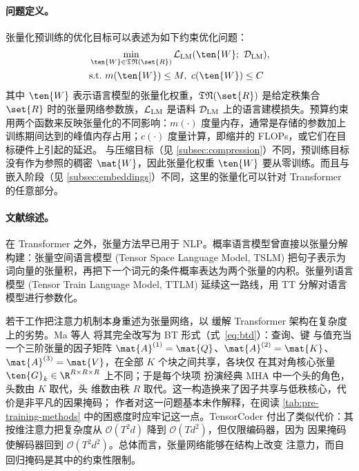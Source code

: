 \paragraph{问题定义。}

张量化预训练的优化目标可以表述为如下约束优化问题：
\begin{equation}
\begin{aligned}
& \min_{\ten{W} \in \mathfrak{TN}(\set{R})} \mathcal{L}_{\rm LM} (\ten{W}; \ \mathcal{D}_{\rm LM}), \\
& {\rm s.t.} ~ m(\ten{W}) \leq M,\ c(\ten{W}) \leq C
\end{aligned}
\end{equation}
其中 $\ten{W}$ 表示语言模型的张量化权重，$\mathfrak{TN}(\set{R})$ 是给定秩集合 $\set{R}$ 时的张量网络参数族，$\mathcal{L}_{\rm LM}$ 是语料 $\mathcal{D}_{\rm LM}$ 上的语言建模损失。预算约束用两个函数来反映张量化的不同影响：$m(\cdot)$ 度量内存，通常是存储的参数加上训练期间达到的峰值内存占用；$c(\cdot)$ 度量计算，即缩并的 FLOPs，或它们在目标硬件上引起的延迟。
与压缩目标（见 \cref{subsec:compression}）不同，预训练目标没有作为参照的稠密 $\mat{W}$，因此张量化权重 $\ten{W}$ 要从零训练。而且与嵌入阶段（见 \cref{subsec:embeddings}）不同，这里的张量化可以针对 Transformer 的任意部分。

\paragraph{文献综述。} 

在 Transformer 之外，张量方法早已用于 NLP。概率语言模型曾直接以张量分解构建：张量空间语言模型 (Tensor Space Language Model, TSLM) \cite{zhang2019tslm} 把句子表示为词向量的张量积，再把下一个词元的条件概率表达为两个张量的内积。张量列语言模型 (Tensor Train Language Model, TTLM) \cite{su2024ttlm} 延续这一路线，用 TT 分解对语言模型进行参数化。


若干工作把注意力机制本身重述为张量网络，以
缓解 Transformer 架构在复杂度上的劣势。Ma 等人
\cite{ma2019tensorized} 将其完全改写为 BT 形式（式~\eqref{eq:btd}）：查询、键
与值充当一个三阶张量的因子矩阵 $\mat{A}^{(1)} = \mat{Q}$、$\mat{A}^{(2)} = \mat{K}$、
$\mat{A}^{(3)} = \mat{V}$，在全部 $K$ 个块之间共享，各块仅
在其对角核心张量 $\ten{G}_k \in \R^{R \times R \times R}$ 上不同；于是每个块项
扮演经典 MHA 中一个头的角色，头数由 $K$ 取代，头
维数由秩 $R$ 取代。这一构造换来了因子共享与低秩核心，代价是非平凡的因果掩码；
作者对这一问题基本未作解释，在阅读
\cref{tab:pre-training-methods} 中的困惑度时应牢记这一点。TensorCoder
\cite{zhang2020tensorcoder} 付出了类似代价：其按维注意力把复杂度从 $\mathcal{O}(T^2 d)$ 降到
$\mathcal{O}(T d^2)$，但仅限编码器，因为
因果掩码使解码器回到 $\mathcal{O}(T^2 d^2)$。总体而言，张量网络能够在结构上改变
注意力，而自回归掩码是其中的约束性限制。

